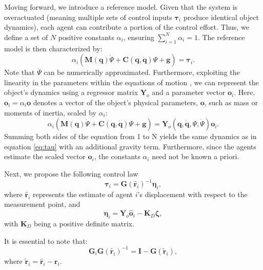 Moving forward, we introduce a reference model. Given that the system is overactuated (meaning multiple sets of control inputs $\boldsymbol{\tau}_i$ produce identical object dynamics), each agent can contribute a portion of the control effort. Thus, we define a set of $N$ positive constants $\alpha_i$, ensuring $\sum_{i=1}^N\alpha_i=1$. The reference model is then characterized by:
\begin{equation}
    \alpha _i \left(\mathbf {M}(\mathbf {q})\dot{\Psi} + \mathbf {C}(\mathbf {q},\dot{\mathbf {q}})\Psi + \mathbf {g} \right) = \boldsymbol{\tau}_i.
\end{equation}
Note that $\dot{\Psi}$ can be numerically approximated. Furthermore, exploiting the linearity in the parameters within the equations of motion \citep{spong2020robot}, we can represent the object's dynamics using a regressor matrix $\mathbf{Y}_o$ and a parameter vector $\mathbf{o}_i$. Here, $\mathbf{o}_i = \alpha_i\mathbf{o}$ denotes a vector of the object's physical parameters, $\mathbf{o}$, such as mass or moments of inertia, scaled by $\alpha_i$:
\begin{equation}
    \alpha _i \left(\mathbf {M}(\mathbf {q})\dot{\Psi} + \mathbf {C}(\mathbf {q},\dot{\mathbf {q}})\Psi + \mathbf {g} \right) = \mathbf {Y}_o\left(\mathbf{q},\dot{\mathbf{q}},\Psi, \dot{\Psi}\right) \mathbf {o}_i. \label{eq:linearparametrizationModelRef}
\end{equation}
Summing both sides of the equation from 1 to N yields the same dynamics as in equation \eqref{eq:tau} with an additional gravity term. Furthermore, since the agents estimate the scaled vector $\mathbf{o}_i$, the constants $\alpha_i$ need not be known a priori.

Next, we propose the following control law
\begin{equation}
    \boldsymbol{\tau}_i = \mathbf{G}(\hat{\mathbf{r}}_i)^{-1}\boldsymbol{\eta}_i,\label{eq:controlLawTaui}
\end{equation}
where $\hat{\mathbf{r}}_i$ represents the estimate of agent $i$'s displacement with respect to the measurement point, and
\begin{equation}
    \boldsymbol{\eta}_i = \mathbf{Y}_o\hat{\mathbf{o}}_i - \mathbf{K}_D\boldsymbol{\zeta}, \label{eq:controlLawEtai}
\end{equation}
with $\mathbf{K}_D$ being a positive definite matrix.

It is essential to note that:
\begin{equation}
    \mathbf{G}_i\mathbf{G}(\hat{\mathbf{r}}_i)^{-1} = \mathbf{I} - \mathbf{G}(\widetilde{\mathbf{r}}_i), \label{eq:relationGiGiInvtoProof}
\end{equation}
where $\widetilde{\mathbf{r}}_i = \hat{\mathbf{r}}_i - \mathbf{r}_i$.

